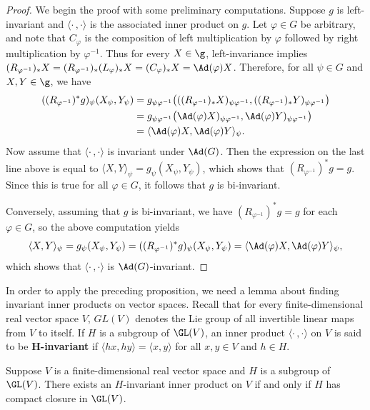 \begin{proof}
We begin the proof with some preliminary computations. Suppose $g$ is left-invariant and 
$\langle\cdot\,,\cdot\rangle$ is the associated inner product on $g$. Let $\varphi\in G$ be 
arbitrary, and note that $C_\varphi$ is the composition of left multiplication by $\varphi$ 
followed by right multiplication by $\varphi^{-1}$. Thus for every $X\in\g$, left-invariance 
implies $(R_{\varphi^{-1}})_*X=(R_{\varphi^{-1}})_*(L_{\varphi})_*X=(C_{\varphi})_*X=\Ad(\varphi)X$. 
Therefore, for all $\psi\in G$ and $X,Y\in\g$, we have
\begin{align*}
((R_{\varphi^{-1}})^*g)_{\psi}(X_{\psi},Y_{\psi})&=g_{\psi\varphi^{-1}}\big(((R_{\varphi^{-1}})_*X)_{\psi\varphi^{-1}},((R_{\varphi^{-1}})_*Y)_{\psi\varphi^{-1}}\big)\\
&=g_{\psi\varphi^{-1}}\big(\Ad(\varphi)X)_{\psi\varphi^{-1}},\Ad(\varphi)Y)_{\psi\varphi^{-1}}\big)\\
&=\langle\Ad(\varphi)X,\Ad(\varphi)Y\rangle_{\psi}.
\end{align*}
Now assume that $\langle\cdot\,,\cdot\rangle$ is invariant under $\Ad(G)$. Then the expression 
on the last line above is equal to $\langle X,Y\rangle_{\psi}=g_{\psi}(X_{\psi},Y_{\psi})$, which 
shows that $(R_{\varphi^{-1}})^*g=g$. Since this is true for all $\varphi\in G$, it follows that 
$g$ is bi-invariant.\par
Conversely, assuming that $g$ is bi-invariant, we have $(R_{\varphi^{-1}})^*g=g$ for each $\varphi\in G$, 
so the above computation yields
\[\langle X,Y\rangle_{\psi}=g_{\psi}(X_{\psi},Y_{\psi})=((R_{\varphi^{-1}})^*g)_{\psi}(X_{\psi},Y_{\psi})=\langle\Ad(\varphi)X,\Ad(\varphi)Y\rangle_{\psi},\]
which shows that $\langle\cdot\,,\cdot\rangle$ is $\Ad(G)$-invariant.
\end{proof}
In order to apply the preceding proposition, we need a lemma about finding invariant inner 
products on vector spaces. Recall that for every finite-dimensional real vector space $V$, 
$GL(V)$ denotes the Lie group of all invertible linear maps from $V$ to itself. If $H$ is a 
subgroup of $\GL(V)$, an inner product $\langle\cdot\,,\cdot\rangle$ on $V$ is said to be 
\textbf{$\bm{H}$-invariant} if $\langle hx,hy\rangle=\langle x,y\rangle$ for all $x,y\in V$ 
and $h\in H$.
\begin{lemma}\label{inner prod inv iff}
Suppose $V$ is a finite-dimensional real vector space and $H$ is a subgroup of $\GL(V)$. 
There exists an $H$-invariant inner product on $V$ if and only if $H$ has compact closure 
in $\GL(V)$.
\end{lemma}
